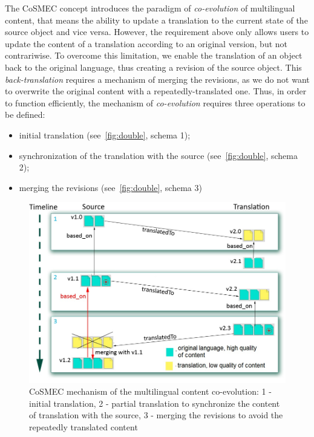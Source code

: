 \documentclass[ngerman,UKenglish,table]{scrbook}
\begin{document}
The CoSMEC concept introduces the paradigm of \emph{co-evolution} of multilingual content, that means the ability to update a translation to the current state of the source object and vice versa.
However, the requirement above only allows users to update the content of a translation according to an original version, but not contrariwise.
To overcome this limitation, we enable the translation of an object back to the original language, thus creating a revision of the source object.
This \emph{back-translation} requires a mechanism of merging the revisions, as we do not want to overwrite the original content with a repeatedly-translated one.
Thus, in order to function efficiently, the mechanism of \emph{co-evolution} requires three operations to be defined:
\begin{itemize}
\item initial translation (see~\autoref{fig:double}, schema 1);
\item synchronization of the translation with the source (see~\autoref{fig:double}, schema 2);
\item merging the revisions (see~\autoref{fig:double}, schema 3)
\end{itemize}

\begin{figure}[!ht]
	\centering
		\includegraphics[width=\textwidth]{images/double-translation.jpg}
	\caption{CoSMEC mechanism of the multilingual content co-evolution: 1 - initial translation, 2 - partial translation to synchronize the content of translation with the source, 3 - merging the revisions to avoid the repeatedly translated content}
	\label{fig:double}
\end{figure}
\end{document}

